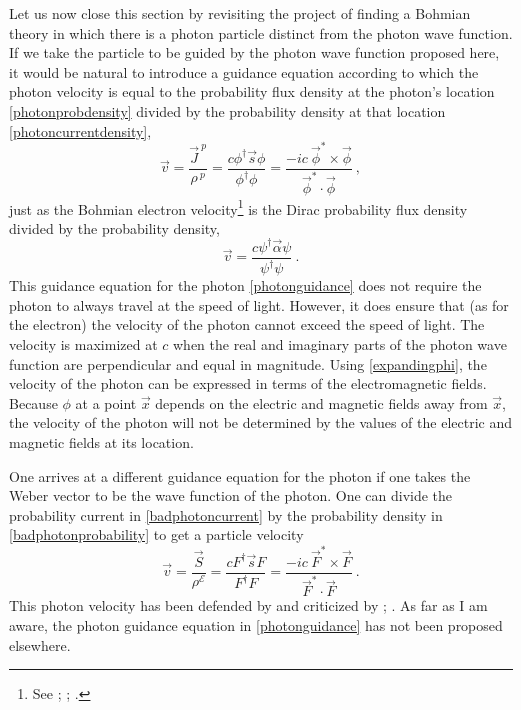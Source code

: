 \documentclass[12pt,secnumarabic,amsmath,amssymb,balancelastpage,nofootinbib]{article}
\begin{document}
Let us now close this section by revisiting the project of finding a Bohmian theory in which there is a photon particle distinct from the photon wave function.  If we take the particle to be guided by the photon wave function proposed here, it would be natural to introduce a guidance equation according to which the photon velocity is equal to the probability flux density at the photon's location \eqref{photonprobdensity} divided by the probability density at that location \eqref{photoncurrentdensity},
\begin{equation}
\vec{v}=\frac{\vec{J}^{\:p}}{\rho^{\:p}}=\frac{c \phi^\dagger \vec{s} \phi}{\phi^\dagger \phi} =\frac{-i c\:\vec{\phi}^* \! \times \! \vec{\phi}}{\vec{\phi}^* \cdot \vec{\phi}}
\ ,
\label{photonguidance}
\end{equation}
just as the Bohmian electron velocity\footnote{See \citet{bohm1953}; \citet[sec.\ 12.2]{bohmhiley}; \citet[sec.\ 12.2]{holland}.} is the Dirac probability flux density divided by the probability density,
\begin{equation}
\vec{v}=\frac{c \psi^\dagger \vec{\alpha} \psi}{\psi^\dagger \psi}
\ .
\label{electronguidance}
\end{equation}
This guidance equation for the photon \eqref{photonguidance} does not require the photon to always travel at the speed of light.  However, it does ensure that (as for the electron) the velocity of the photon cannot exceed the speed of light.  The velocity is maximized at $c$ when the real and imaginary parts of the photon wave function are perpendicular and equal in magnitude.  Using \eqref{expandingphi}, the velocity of the photon can be expressed in terms of the electromagnetic fields.  Because $\phi$ at a point $\vec{x}$ depends on the electric and magnetic fields away from $\vec{x}$, the velocity of the photon will not be determined by the values of the electric and magnetic fields at its location.

One arrives at a different guidance equation for the photon if one takes the Weber vector to be the wave function of the photon.  One can divide the probability current in \eqref{badphotoncurrent} by the probability density in \eqref{badphotonprobability} to get a particle velocity
\begin{equation}
\vec{v}=\frac{\vec{S}}{\rho^{\mathcal{E}}}=\frac{c F^\dagger \vec{s} F}{F^\dagger F} =\frac{-i c\:\vec{F}^* \! \times \! \vec{F}}{\vec{F}^* \cdot \vec{F}}
\ .
\label{badphotonguidance}
\end{equation}
This photon velocity has been defended by \citet{wesley1984} and criticized by \citet[sec.\ 11.2]{bohmhiley}; \citet[sec. 12.6.2]{holland}.  As far as I am aware, the photon guidance equation in \eqref{photonguidance} has not been proposed elsewhere.
\end{document}
